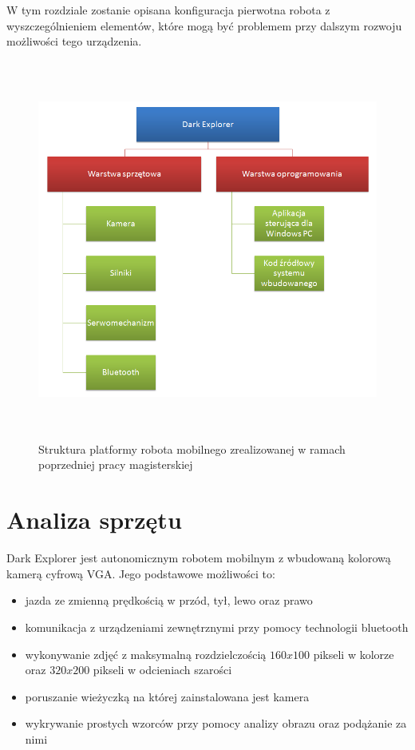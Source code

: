 W tym rozdziale zostanie opisana konfiguracja pierwotna robota z
wyszczególnieniem elementów, które mogą być problemem przy dalszym rozwoju
możliwości tego urządzenia. 

\begin{figure}[!ht]
 \centering \includegraphics[height=125mm]{../images/ch02/kmak_platform.png}
 \caption{Struktura platformy robota mobilnego zrealizowanej w ramach poprzedniej
 pracy magisterskiej\cite{KmakMScThesis2009}}
 \label{fig:KmakPlatform}
\end{figure}

\section{Analiza sprzętu}
Dark Explorer jest autonomicznym robotem mobilnym z wbudowaną kolorową kamerą
cyfrową VGA. Jego podstawowe możliwości to:
\begin{itemize}
 \item jazda ze zmienną prędkością w przód, tył, lewo oraz prawo
 \item komunikacja z urządzeniami zewnętrznymi przy pomocy technologii bluetooth
 \item wykonywanie zdjęć z maksymalną rozdzielczością $160x100$ pikseli w kolorze oraz $320x200$ pikseli w odcieniach szarości
 \item poruszanie wieżyczką na której zainstalowana jest kamera
 \item wykrywanie prostych wzorców przy pomocy analizy obrazu oraz podążanie za nimi
\end{itemize}

